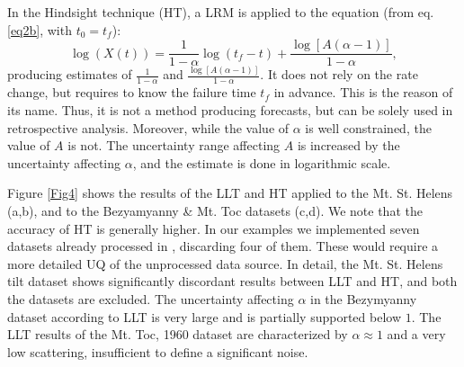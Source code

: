 \documentclass{article}
\begin{document}
In the Hindsight technique (HT), a LRM is applied to the equation (from eq. \ref{eq2b}, with $t_0=t_f$):
$$\log(X(t))=\frac{1}{1-\alpha}\log(t_f-t)+\frac{\log[A(\alpha-1)]}{1-\alpha},$$
producing estimates of $\frac{1}{1-\alpha}$ and $\frac{\log[A(\alpha-1)]}{1-\alpha}$. It does not rely on the rate change, but requires to know the failure time $t_f$ in advance. This is the reason of its name. Thus, it is not a method producing forecasts, but can be solely used in retrospective analysis. Moreover, while the value of $\alpha$ is well constrained, the value of $A$ is not. The uncertainty range affecting $A$ is increased by the uncertainty affecting $\alpha$, and the estimate is done in logarithmic scale.

Figure \ref{Fig4} shows the results of the LLT and HT applied to the Mt. St. Helens (a,b), and to the Bezyamyanny \& Mt. Toc datasets (c,d). We note that the accuracy of HT is generally higher. In our examples we implemented seven datasets already processed in \cite{Voight1988}, discarding four of them. These would require a more detailed UQ of the unprocessed data source. In detail, the Mt. St. Helens tilt dataset shows significantly discordant results between LLT and HT, and both the datasets are excluded. The uncertainty affecting $\alpha$ in the Bezymyanny dataset according to LLT is very large and is partially supported below $1$. The LLT results of the Mt. Toc, 1960 dataset are characterized by $\alpha\approx 1$ and a very low scattering, insufficient to define a significant noise.



\end{document}
